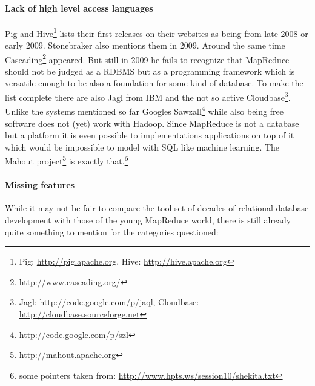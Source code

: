 \documentclass[12pt,a4paper]{scrartcl}		%
\begin{document}
\paragraph{Lack of high level access languages}
Pig and Hive\footnote{Pig: \url{http://pig.apache.org}, Hive: \url{http://hive.apache.org}} lists their first releases on their websites as being from late 2008 or early 2009. Stonebraker also mentions them in 2009\cite[p. 3, sec. 3.3 programming model]{Pavlo09}. Around the same time Cascading\footnote{\url{http://www.cascading.org/}} appeared. But still in 2009 he fails to recognize that MapReduce should not be judged as a RDBMS but as a programming framework which is versatile enough to be also a foundation for some kind of database.
To make the list complete there are also Jagl from IBM and the not so active Cloudbase\footnote{Jagl: \url{http://code.google.com/p/jaql}, Cloudbase: \url{http://cloudbase.sourceforge.net}}. Unlike the systems mentioned so far Googles Sawzall\footnote{\url{http://code.google.com/p/szl}} while also being free software does not (yet) work with Hadoop.
Since MapReduce is not a database but a platform it is even possible to implementations applications on top of it which would be impossible to model with SQL like machine learning. The Mahout project\footnote{\url{http://mahout.apache.org}} is exactly that.\footnote{some pointers taken from: \url{http://www.hpts.ws/session10/shekita.txt}}

\paragraph{Missing features}
While it may not be fair to compare the tool set of decades of relational database development with those of the young MapReduce world, there is still already quite something to mention for the categories questioned:
\end{document}
